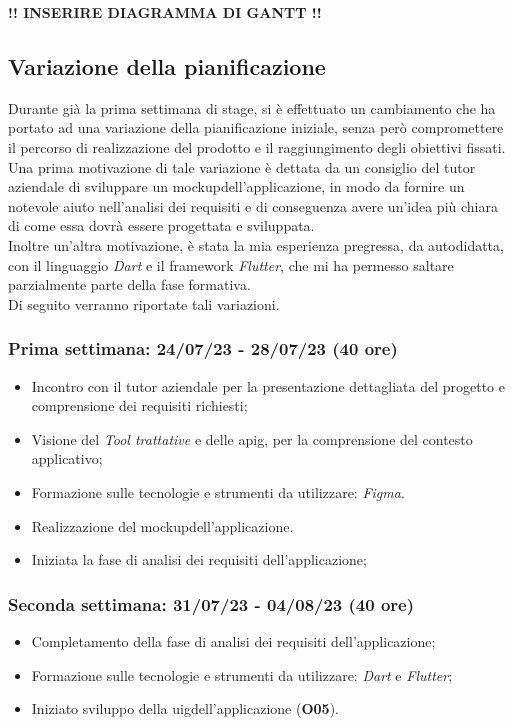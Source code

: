 \textbf{!! INSERIRE DIAGRAMMA DI GANTT !!}

\subsection{Variazione della pianificazione}
\label{subsec:variazione-pianificazione}

Durante già la prima settimana di stage, si è  effettuato un cambiamento che ha portato ad una variazione della pianificazione iniziale, senza però compromettere il percorso di realizzazione del prodotto e il raggiungimento degli obiettivi fissati.\\
Una prima motivazione di tale variazione è dettata da un consiglio del tutor aziendale di sviluppare un \gls{mockup}\glsoccur dell'applicazione, in modo da fornire un notevole aiuto nell'analisi dei requisiti e di conseguenza avere un'idea più chiara di come essa dovrà essere progettata e sviluppata.\\
Inoltre un'altra motivazione, è stata la mia esperienza pregressa, da autodidatta, con il linguaggio \emph{Dart}\cite{site:dart} e il framework \emph{Flutter}\cite{site:flutter}, che mi ha permesso saltare parzialmente parte della fase formativa.\\
Di seguito verranno riportate tali variazioni.

\subsubsection{Prima settimana: 24/07/23 - 28/07/23 (40 ore)}
    \begin{itemize}
        \item Incontro con il tutor aziendale per la presentazione dettagliata del progetto e comprensione dei requisiti richiesti;
        \item Visione del \emph{Tool trattative} e delle \gls{apig}\glsoccur, per la comprensione del contesto applicativo;
        \item Formazione sulle tecnologie e strumenti da utilizzare: \emph{Figma}\cite{site:figma}.
        \item Realizzazione del \gls{mockup}\glsoccur dell'applicazione.
        \item Iniziata la fase di analisi dei requisiti dell'applicazione;
    \end{itemize}
\subsubsection{Seconda settimana: 31/07/23 - 04/08/23 (40 ore)}
    \begin{itemize}
        \item Completamento della fase di analisi dei requisiti dell'applicazione;
        \item Formazione sulle tecnologie e strumenti da utilizzare: \emph{Dart}\cite{site:dart} e \emph{Flutter}\cite{site:flutter};
        \item Iniziato sviluppo  della \gls{uig}\glsoccur dell'applicazione (\textbf{O05}).
    \end{itemize}
